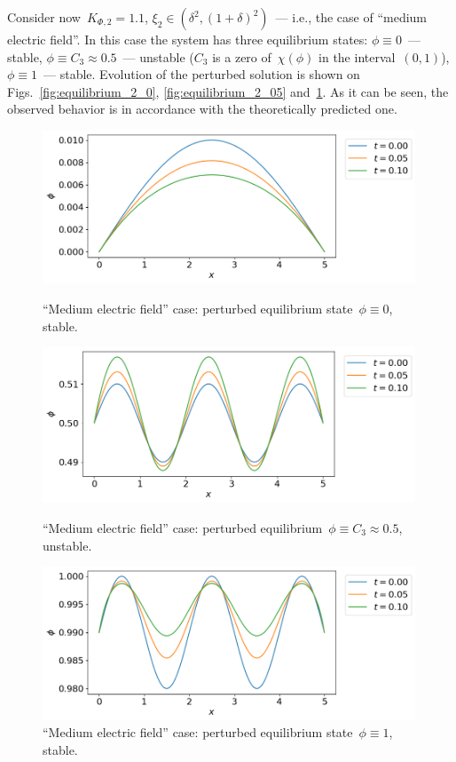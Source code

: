 Consider now~$K_{\Phi, 2} = 1.1$, $\xi_2 \in (\delta^2, (1 +
\delta)^2)$~--- i.e., the case of ``medium electric field''.
In this case the system has three equilibrium  states: $\phi \equiv
0$~--- stable, $\phi \equiv C_3 \approx 0.5$~--- unstable ($C_3$ is a
zero of~$\chi(\phi)$ in the interval~$(0, 1)$), $\phi \equiv 1$~---
stable.
Evolution of the perturbed solution is shown on
Figs.~\ref{fig:equilibrium_2_0}, \ref{fig:equilibrium_2_05}
and~\ref{fig:equilibrium_2_1}.
As it can be seen, the observed behavior is in accordance with the
theoretically predicted one.

\begin{figure}[!tp]
  \centering
  \includegraphics[width=0.99\textwidth]{figures/equilibrium_2_0.png}
  \vspace{-0.3cm}
  \caption{``Medium electric field'' case: perturbed equilibrium state~$\phi \equiv 0$, stable.}
  \label{fig:equilibrium_2_0}
  \vspace{0.5cm}
  
  \includegraphics[width=0.99\textwidth]{figures/equilibrium_2_05.png}
  \vspace{-0.3cm}
  \caption{``Medium electric field'' case: perturbed equilibrium~$\phi \equiv C_3 \approx 0.5$, unstable.}
  \label{fig:equilibrium_2_05}
  \vspace{0.5cm}
  
  \includegraphics[width=0.99\textwidth]{figures/equilibrium_2_1.png}
  \vspace{-0.3cm}
  \caption{``Medium electric field'' case: perturbed equilibrium state~$\phi \equiv 1$, stable.}
  \label{fig:equilibrium_2_1}
\end{figure}

